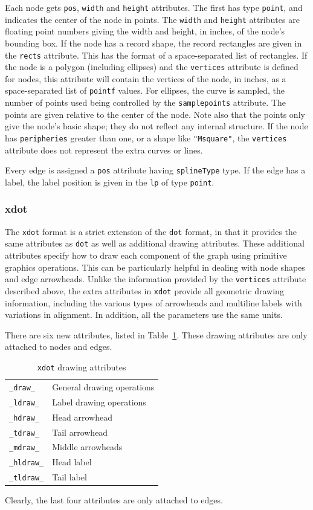 Each node gets {\tt pos}, {\tt width} and {\tt height} attributes. 
The first has type {\tt point}, and indicates the center of the node
in points. The
{\tt width} and {\tt height} attributes are floating point numbers
giving the width and height, in inches, of the node's bounding box.
If the node has a record shape, the record rectangles are given in the 
{\tt rects} attribute. This has the format of a space-separated list
of rectangles. 
If the node is a polygon (including ellipses) and the {\tt vertices}
attribute is defined for nodes, this attribute will contain the 
vertices of the node, in inches, as a space-separated list of {\tt pointf}
values.
For ellipses, the curve is sampled, the number of points used being
controlled by the {\tt samplepoints} attribute.
The points are given relative to the center of the node.
Note also that the points only give the node's basic shape; they do
not reflect any internal structure. If the node has
{\tt peripheries} greater than one, 
or a shape like {\tt "Msquare"}, the {\tt vertices}
attribute does not represent the extra curves or lines.

Every edge is assigned a {\tt pos} attribute having {\tt splineType}
type. If the edge has a label, the label position is given in the
{\tt lp} of type {\tt point}. 

\subsubsection{xdot}
\label{sect:xdot}

The {\tt xdot} format is a strict extension of the {\tt dot} format, in that it
provides the same attributes as {\tt dot} as well as additional drawing
attributes. These additional attributes specify how to draw each component of 
the graph using primitive graphics operations. This can be particularly
helpful in dealing with node shapes and edge arrowheads.
Unlike the information provided by the {\tt vertices} attribute
described above, 
the extra attributes in {\tt xdot} provide all geometric drawing information,
including the various types of arrowheads and multiline labels with
variations in alignment. In addition, all the parameters use the same
units.

There are six new attributes, listed in Table~\ref{table:xdot}.
These drawing attributes are only attached to nodes and edges. 
\begin{table}[htb]
\centering
\begin{tabular}[t]{|ll|} \hline
{\tt \_draw\_} & General drawing operations \\
{\tt \_ldraw\_} & Label drawing operations \\
{\tt \_hdraw\_} & Head arrowhead \\
{\tt \_tdraw\_} & Tail arrowhead \\
{\tt \_mdraw\_} & Middle arrowheads \\
{\tt \_hldraw\_} & Head label \\
{\tt \_tldraw\_} & Tail label \\
\hline
\end{tabular}
\caption{{\tt xdot} drawing attributes}
\label{table:xdot}
\end{table}
Clearly, the last four attributes are only attached to edges.


